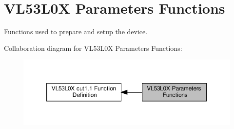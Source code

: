 \hypertarget{group__VL53L0X__parameters__group}{}\section{V\+L53\+L0X Parameters Functions}
\label{group__VL53L0X__parameters__group}


Functions used to prepare and setup the device.  


Collaboration diagram for V\+L53\+L0X Parameters Functions\+:\nopagebreak
\begin{figure}[H]
\begin{center}
\leavevmode
\includegraphics[width=350pt]{group__VL53L0X__parameters__group}
\end{center}
\end{figure}
